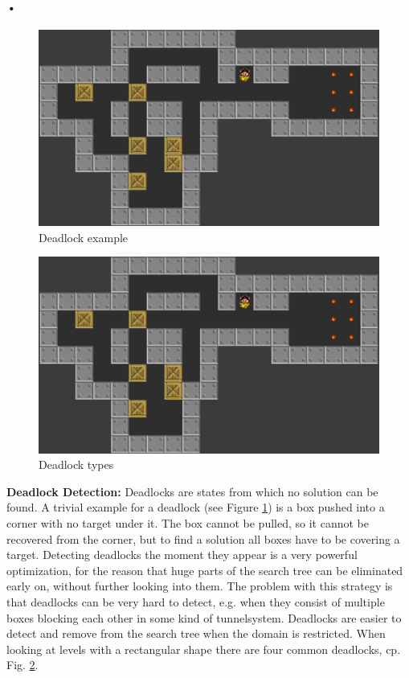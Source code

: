 \documentclass{report}
\begin{document}
\paragraph*{•}
\begin{figure}[h]
\centering
\includegraphics[scale=0.2]{flipped,deadlockexample}
\caption{Deadlock example}
\label{fig:2}
\end{figure}
\begin{figure}[h]
\centering
\includegraphics[scale=0.2]{deadlocktypes}
\caption{Deadlock types}
\label{fig:3}
\end{figure}
\textbf{Deadlock Detection:} Deadlocks are states from which no solution can be found. A trivial example for a deadlock (see Figure \ref{fig:2}) is a box pushed into a corner with no target under it. The box cannot be pulled, so it cannot be recovered from the corner, but to find a solution all boxes have to be covering a target.
Detecting deadlocks the moment they appear is a very powerful optimization, for the reason that huge parts of the search tree can be eliminated early on, without further looking into them. The problem with this strategy is that deadlocks can be very hard to detect, e.g. when they consist of multiple boxes blocking each other in some kind of tunnelsystem. Deadlocks are easier to detect and remove from the search tree when the domain is restricted. When looking at levels with a rectangular shape there are four common deadlocks, cp. Fig. \ref{fig:3}.
\end{document}
